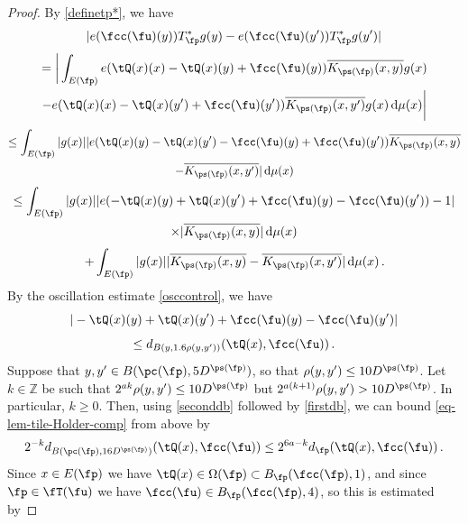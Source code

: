     \begin{proof}
        \leanok
        By \eqref{definetp*}, we have
        $$
            |e(\fcc(\fu)(y)) T_{\fp}^* g(y) - e(\fcc(\fu)(y')) T_{\fp}^* g(y')|
        $$
        \begin{multline*}
            =\bigg| \int_{E(\fp)} e(\tQ(x)(x) - \tQ(x)(y) + \fcc(\fu)(y)) \overline{K_{\ps(\fp)}(x, y)} g(x) \\
            - e(\tQ(x)(x) - \tQ(x)(y') + \fcc(\fu)(y')) \overline{K_{\ps(\fp)}(x, y')} g(x) \, \mathrm{d}\mu(x)\bigg|
        \end{multline*}
        \begin{multline*}
            \leq\int_{E(\fp)} |g(x)| |e(\tQ(x)(y) - \tQ(x)(y') - \fcc(\fu)(y) + \fcc(\fu)(y'))\overline{K_{\ps(\fp)}(x, y)}\\
            - \overline{K_{\ps(\fp)}(x, y')}| \, \mathrm{d}\mu(x)
        \end{multline*}
        \begin{multline}
            \leq\int_{E(\fp)} |g(x)| |e(-\tQ(x)(y) + \tQ(x)(y') + \fcc(\fu)(y) - \fcc(\fu)(y')) - 1| \\
            \times |\overline{K_{\ps(\fp)}(x, y)}|\, \mathrm{d}\mu(x) \label{T*Holder1b}
        \end{multline}
      \begin{equation}
            + \int_{E(\fp)} |g(x)| |\overline{K_{\ps(\fp)}(x, y)} - \overline{K_{\ps(\fp)}(x, y')} |\, \mathrm{d}\mu(x)\,.\label{T*Holder1}
        \end{equation}
        By the oscillation estimate \eqref{osccontrol}, we have
        $$
            |-\tQ(x)(y) + \tQ(x)(y') + \fcc(\fu)(y) - \fcc(\fu)(y')|
        $$
      \begin{equation}
            \label{eq-lem-tile-Holder-comp}
            \le d_{B(y, 1.6\rho(y,y'))}(\tQ(x), \fcc(\fu))\,.
        \end{equation}
        Suppose that $y, y' \in B(\pc(\fp), 5D^{\ps(\fp)})$, so that $\rho(y,y') \le 10D^{\ps(\fp)}$.
        Let $k \in \mathbb{Z}$ be such that $2^{ak}\rho(y,y') \le 10D^{\ps(\fp)}$ but $2^{a(k+1)} \rho(y,y') > 10D^{\ps(\fp)}$.
        In particular, $k \ge 0$. Then, using \eqref{seconddb} followed by \eqref{firstdb}, we can bound \eqref{eq-lem-tile-Holder-comp} from above by
        $$
            2^{-k} d_{B(\pc(\fp), 16 D^{\ps(\fp)})}(\tQ(x), \fcc(\fu)) \le 2^{6a - k} d_{\fp}(\tQ(x), \fcc(\fu))\,.
        $$
        Since $x \in E(\fp)$ we have $\tQ(x) \in \Omega(\fp) \subset B_{\fp}(\fcc(\fp), 1)$, and since $\fp \in \fT(\fu)$ we have $\fcc(\fu) \in B_{\fp}(\fcc(\fp), 4)$, so this is estimated by

\end{proof}
